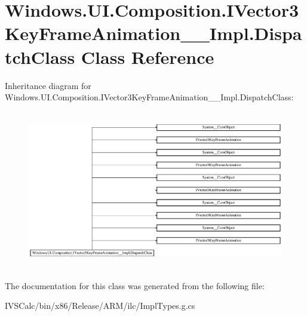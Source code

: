 \hypertarget{class_windows_1_1_u_i_1_1_composition_1_1_i_vector3_key_frame_animation_____impl_1_1_dispatch_class}{}\section{Windows.\+U\+I.\+Composition.\+I\+Vector3\+Key\+Frame\+Animation\+\_\+\+\_\+\+Impl.\+Dispatch\+Class Class Reference}
\label{class_windows_1_1_u_i_1_1_composition_1_1_i_vector3_key_frame_animation_____impl_1_1_dispatch_class}
Inheritance diagram for Windows.\+U\+I.\+Composition.\+I\+Vector3\+Key\+Frame\+Animation\+\_\+\+\_\+\+Impl.\+Dispatch\+Class\+:\begin{figure}[H]
\begin{center}
\leavevmode
\includegraphics[height=6.968326cm]{class_windows_1_1_u_i_1_1_composition_1_1_i_vector3_key_frame_animation_____impl_1_1_dispatch_class}
\end{center}
\end{figure}


The documentation for this class was generated from the following file\+:\begin{DoxyCompactItemize}
\item 
I\+V\+S\+Calc/bin/x86/\+Release/\+A\+R\+M/ilc/Impl\+Types.\+g.\+cs\end{DoxyCompactItemize}
